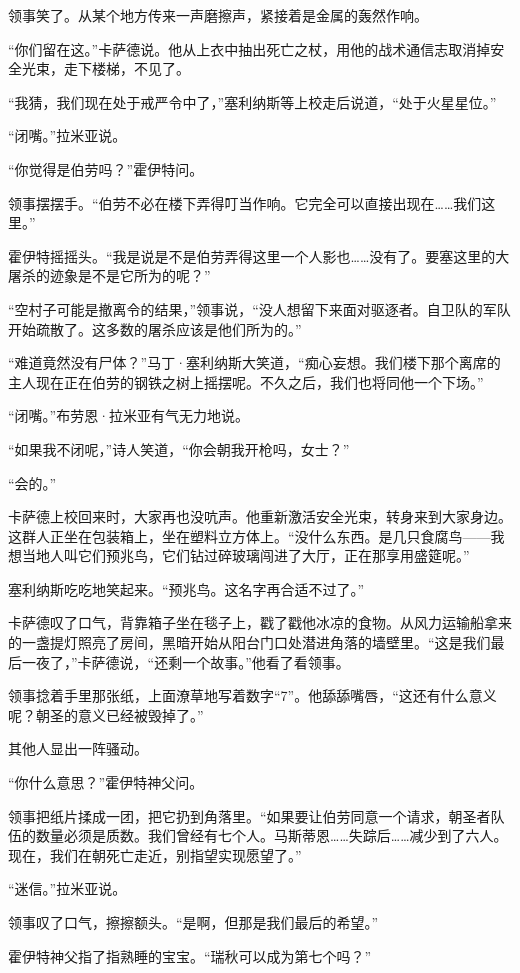 \documentclass[AutoFakeBold=true]{book}
\begin{document}
领事笑了。从某个地方传来一声磨擦声，紧接着是金属的轰然作响。

``你们留在这。''卡萨德说。他从上衣中抽出死亡之杖，用他的战术通信志取消掉安全光束，走下楼梯，不见了。

``我猜，我们现在处于戒严令中了，''塞利纳斯等上校走后说道，``处于火星星位。''

``闭嘴。''拉米亚说。

``你觉得是伯劳吗？''霍伊特问。

领事摆摆手。``伯劳不必在楼下弄得叮当作响。它完全可以直接出现在……我们这里。''

霍伊特摇摇头。``我是说是不是伯劳弄得这里一个人影也……没有了。要塞这里的大屠杀的迹象是不是它所为的呢？''

``空村子可能是撤离令的结果，''领事说，``没人想留下来面对驱逐者。自卫队的军队开始疏散了。这多数的屠杀应该是他们所为的。''

``难道竟然没有尸体？''马丁·塞利纳斯大笑道，``痴心妄想。我们楼下那个离席的主人现在正在伯劳的钢铁之树上摇摆呢。不久之后，我们也将同他一个下场。''

``闭嘴。''布劳恩·拉米亚有气无力地说。

``如果我不闭呢，''诗人笑道，``你会朝我开枪吗，女士？''

``会的。''

卡萨德上校回来时，大家再也没吭声。他重新激活安全光束，转身来到大家身边。这群人正坐在包装箱上，坐在塑料立方体上。``没什么东西。是几只食腐鸟——我想当地人叫它们预兆鸟，它们钻过碎玻璃闯进了大厅，正在那享用盛筵呢。''

塞利纳斯吃吃地笑起来。``预兆鸟。这名字再合适不过了。''

卡萨德叹了口气，背靠箱子坐在毯子上，戳了戳他冰凉的食物。从风力运输船拿来的一盏提灯照亮了房间，黑暗开始从阳台门口处潜进角落的墙壁里。``这是我们最后一夜了，''卡萨德说，``还剩一个故事。''他看了看领事。

领事捻着手里那张纸，上面潦草地写着数字``7''。他舔舔嘴唇，``这还有什么意义呢？朝圣的意义已经被毁掉了。''

其他人显出一阵骚动。

``你什么意思？''霍伊特神父问。

领事把纸片揉成一团，把它扔到角落里。``如果要让伯劳同意一个请求，朝圣者队伍的数量必须是质数。我们曾经有七个人。马斯蒂恩……失踪后……减少到了六人。现在，我们在朝死亡走近，别指望实现愿望了。''

``迷信。''拉米亚说。

领事叹了口气，擦擦额头。``是啊，但那是我们最后的希望。''

霍伊特神父指了指熟睡的宝宝。``瑞秋可以成为第七个吗？''
\end{document}
